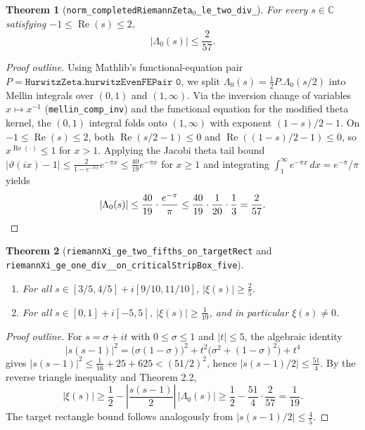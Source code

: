 \documentclass[11pt]{article}
\newtheorem{theorem}{Theorem}[section]
\theoremstyle{remark}
\begin{document}
\begin{theorem}[\texttt{norm\_\allowbreak completedRiemannZeta$_0$\_\allowbreak le\_\allowbreak two\_\allowbreak div\_}]
For every $s \in \mathbb{C}$ satisfying $-1 \le \operatorname{Re}(s) \le 2$,
\[
|\Lambda_0(s)| \le \frac{2}{57}.
\]
\end{theorem}
\begin{proof}[Proof outline]
Using Mathlib's functional-equation pair $P = \texttt{HurwitzZeta.hurwitzEvenFEPair 0}$, we split $\Lambda_0(s) = \frac{1}{2}P.\Lambda_0(s/2)$ into Mellin integrals over $(0,1)$ and $(1,\infty)$. Via the inversion change of variables $x \mapsto x^{-1}$ (\texttt{mellin\_\allowbreak comp\_\allowbreak inv}) and the functional equation for the modified theta kernel, the $(0,1)$ integral folds onto $(1,\infty)$ with exponent $(1-s)/2 - 1$. On $-1 \le \operatorname{Re}(s) \le 2$, both $\operatorname{Re}(s/2 - 1) \le 0$ and $\operatorname{Re}((1-s)/2 - 1) \le 0$, so $x^{\operatorname{Re}(\cdot)} \le 1$ for $x > 1$. Applying the Jacobi theta tail bound $|\vartheta(ix) - 1| \le \frac{2}{1 - e^{-\pi x}} e^{-\pi x} \le \frac{40}{19} e^{-\pi x}$ for $x \ge 1$ and integrating $\int_1^\infty e^{-\pi x}\,dx = e^{-\pi}/\pi$ yields
\[
|\Lambda_0(s)| \le \frac{40}{19}\cdot\frac{e^{-\pi}}{\pi} \le \frac{40}{19}\cdot\frac{1}{20}\cdot\frac{1}{3} = \frac{2}{57}. \qedhere
\]
\end{proof}

\begin{theorem}[\texttt{riemannXi\_\allowbreak ge\_\allowbreak two\_\allowbreak fifths\_\allowbreak on\_\allowbreak targetRect} and \texttt{riemannXi\_\allowbreak ge\_\allowbreak one\_\allowbreak div\_\_\allowbreak on\_\allowbreak criticalStripBox\_\allowbreak five}]
\leavevmode
\begin{enumerate}
    \item For all $s \in [3/5, 4/5] + i[9/10, 11/10]$, $|\xi(s)| \ge \frac{2}{5}$.
    \item For all $s \in [0, 1] + i[-5, 5]$, $|\xi(s)| \ge \frac{1}{19}$, and in particular $\xi(s) \neq 0$.
\end{enumerate}
\end{theorem}
\begin{proof}[Proof outline]
For $s = \sigma + it$ with $0 \le \sigma \le 1$ and $|t| \le 5$, the algebraic identity
\[
|s(s-1)|^2 = \bigl(\sigma(1-\sigma)\bigr)^2 + t^2\bigl(\sigma^2 + (1-\sigma)^2\bigr) + t^4
\]
gives $|s(s-1)|^2 \le \frac{1}{16} + 25 + 625 < (51/2)^2$, hence $|s(s-1)/2| \le \frac{51}{4}$. By the reverse triangle inequality and Theorem 2.2,
\[
|\xi(s)| \ge \frac{1}{2} - \left|\frac{s(s-1)}{2}\right|\,|\Lambda_0(s)| \ge \frac{1}{2} - \frac{51}{4}\cdot\frac{2}{57} = \frac{1}{19}.
\]
The target rectangle bound follows analogously from $|s(s-1)/2| \le \frac{4}{5}$.
\end{proof}
\end{document}
